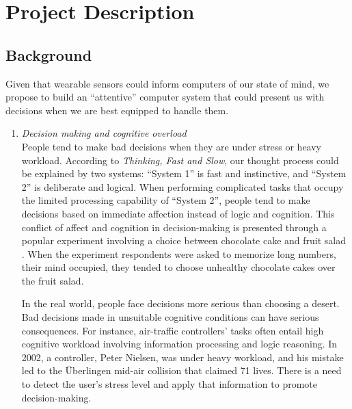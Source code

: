 \documentclass[12pt]{article}
\begin{document}


\section{Project Description}\label{project-description}

\subsection{Background}\label{background}

Given that wearable sensors could inform computers of our state of mind, we propose to build an ``attentive'' computer system that could present us with decisions when we are best equipped to handle them. 



\begin{enumerate}
\def\labelenumi{\noindent \alph{enumi}.}
\itemsep0pt\parskip0pt
\item{\it Decision making and cognitive overload}\\
  People tend to make bad decisions when they are under stress or heavy workload. 
  According to {\it Thinking, Fast and Slow}, our thought process could be explained by two systems: ``System 1'' is fast and instinctive, and ``System 2'' is deliberate and logical. When performing complicated tasks that occupy the limited processing capability of ``System 2'', people tend to make decisions based on immediate affection instead of logic and cognition. This conflict of affect and cognition in decision-making is presented through a popular experiment involving a choice between chocolate cake and fruit salad \parencite{Fedorikhin2014}. When the experiment respondents were asked to memorize long numbers, their mind occupied, they tended to choose unhealthy chocolate cakes over the fruit salad. 


  \hspace{15pt} In the real world, people face decisions more serious than choosing a desert. Bad decisions made in unsuitable cognitive conditions can have serious consequences. For instance, air-traffic controllers' tasks often entail high cognitive workload involving information processing and logic reasoning. In 2002, a controller, Peter Nielsen, was under heavy workload, and his mistake led to the \"{U}berlingen mid-air collision that claimed 71 lives. There is a need to detect the user's stress level and apply that information to promote decision-making.\\


\end{enumerate}
\end{document}
